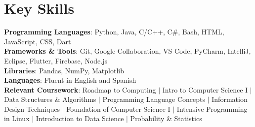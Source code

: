 \documentclass[letterpaper,11pt]{article}
\begin{document}
\section{Key Skills}
\begin{itemize}[leftmargin=0.15in, label={}]
    \small{\item{
      \textbf{Programming Languages}{: Python, Java, C/C++, C\#, Bash, HTML, JavaScript, CSS, Dart} \\
      \textbf{Frameworks \& Tools}{: Git, Google Collaboration, VS Code, PyCharm, IntelliJ, Eclipse, Flutter, Firebase, Node.js} \\
      \textbf{Libraries}{: Pandas, NumPy, Matplotlib} \\
      \textbf{Languages}{: Fluent in English and Spanish} \\
      \textbf{Relevant Coursework}{: Roadmap to Computing $|$ Intro to Computer Science I $|$ Data Structures \& Algorithms $|$ Programming Language Concepts $|$ Information Design Techniques $|$ Foundation of Computer Science I $|$ Intensive Programming in Linux $|$ Introduction to Data Science $|$ Probability \& Statistics} \\
    }}
\end{itemize}
\end{document}

